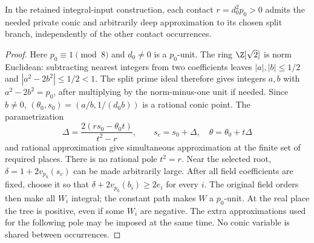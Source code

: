 \begin{lemma}\label{lem:quartic-conic-completeness}
In the retained integral-input construction, each contact
$r=d_0^2p_0>0$ admits the needed private conic and arbitrarily deep
approximation to its chosen split branch, independently of the other
contact occurrences.
\end{lemma}
\begin{proof}
Here $p_0\equiv1\pmod8$ and $d_0\ne0$ is a $p_0$-unit. The ring
$\Z[\sqrt2]$ is norm Euclidean: subtracting nearest integers from two
coefficients leaves $|a|,|b|\le1/2$ and $|a^2-2b^2|\le1/2<1$.
The split prime ideal therefore gives integers $a,b$ with $a^2-2b^2=p_0$,
after multiplying by the norm-minus-one unit if needed. Since $b\ne0$,
$(\theta_0,s_0)=(a/b,1/(d_0b))$ is a rational conic point. The parametrization
\[
 \Delta=\frac{2(rs_0-\theta_0 t)}{t^2-r},\qquad
 s_c=s_0+\Delta,\quad \theta=\theta_0+t\Delta
\]
and rational approximation give simultaneous approximation at the finite
set of required places. There is no rational pole $t^2=r$.
Near the selected root, $\delta=1+2v_{p_0}(s_c)$ can be made arbitrarily
large. After all field coefficients are fixed, choose it so that
$\delta+2v_{p_0}(b_i)\ge2e_i$ for every $i$. The original field orders
then make all $W_i$ integral; the constant path makes $W$ a $p_0$-unit.
At the real place the tree is positive, even if some $W_i$ are negative.
The extra approximations used for the following pole may be imposed at
the same time. No conic variable is shared between occurrences.
\end{proof}


